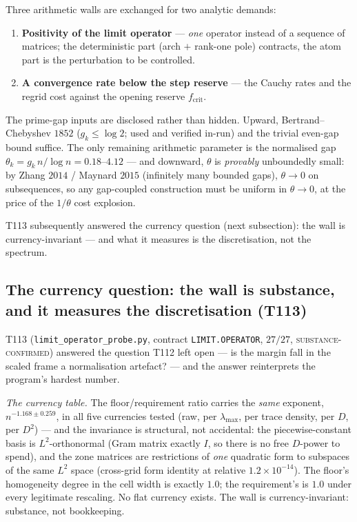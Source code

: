 \documentclass[11pt,a4paper]{article}
\begin{document}
\begin{keybox}
Three arithmetic walls are exchanged for two analytic demands:
\begin{enumerate}[leftmargin=1.6em]
\item[\textbf{[P1]}] \textbf{Positivity of the limit operator} --- \emph{one} operator instead of a
sequence of matrices; the deterministic part (arch $+$ rank-one pole) contracts, the atom part is
the perturbation to be controlled.
\item[\textbf{[P2]}] \textbf{A convergence rate below the step reserve} --- the Cauchy rates and the
regrid cost against the opening reserve $f_{\mathrm{crit}}$.
\end{enumerate}
The prime-gap inputs are disclosed rather than hidden. Upward, Bertrand--Chebyshev $1852$
($g_k\le\log2$; used and verified in-run) and the trivial even-gap bound suffice. The only remaining
arithmetic parameter is the normalised gap $\theta_k=g_k\,n/\log n=0.18$--$4.12$ --- and downward,
$\theta$ is \emph{provably} unboundedly small: by Zhang $2014$ / Maynard $2015$ (infinitely many
bounded gaps), $\theta\to0$ on subsequences, so any gap-coupled construction must be uniform in
$\theta\to0$, at the price of the $1/\theta$ cost explosion.
\end{keybox}

\noindent T113 subsequently answered the currency question (next subsection): the wall is
currency-invariant --- and what it measures is the discretisation, not the spectrum.

\subsection{The currency question: the wall is substance, and it measures the discretisation (T113)}
T113 (\texttt{limit\_operator\_probe.py}, contract \texttt{LIMIT.OPERATOR}, $27/27$,
\textsc{substance-confirmed}) answered the question T112 left open --- is the margin fall in the
scaled frame a normalisation artefact? --- and the answer reinterprets the program's hardest number.

\emph{The currency table.} The floor/requirement ratio carries the \emph{same} exponent,
$n^{-1.168\pm0.259}$, in all five currencies tested (raw, per $\lambda_{\max}$, per trace density,
per $D$, per $D^2$) --- and the invariance is structural, not accidental: the piecewise-constant
basis is $L^2$-orthonormal (Gram matrix exactly $I$, so there is no free $D$-power to spend), and
the zone matrices are restrictions of \emph{one} quadratic form to subspaces of the same $L^2$
space (cross-grid form identity at relative $1.2\times10^{-14}$). The floor's homogeneity degree in
the cell width is exactly $1.0$; the requirement's is $1.0$ under every legitimate rescaling. No
flat currency exists. The wall is currency-invariant: substance, not bookkeeping.
\end{document}
